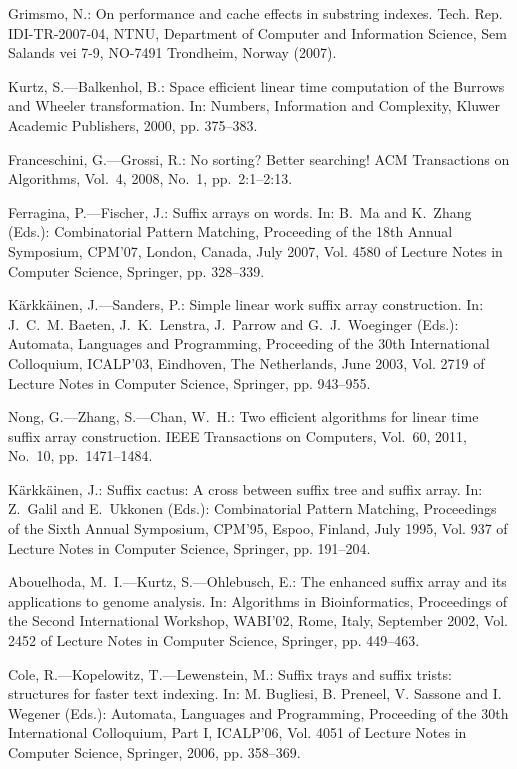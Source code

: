 \documentclass{cai}
\begin{document}
\begin{thebibliography}{99}
Grimsmo, N.: On performance and cache effects in substring indexes. Tech. Rep.
  IDI-TR-2007-04, NTNU, Department of Computer and Information Science, Sem
  Salands vei 7-9, NO-7491 Trondheim, Norway (2007).

Kurtz, S.---Balkenhol, B.: Space efficient linear time computation of the
  {Burrows} and {Wheeler} transformation. In: Numbers, Information and
  Complexity, Kluwer Academic Publishers, 2000, pp. 375--383.

Franceschini, G.---Grossi, R.: No sorting? {B}etter searching! ACM Transactions
  on Algorithms, Vol.~4, 2008, No.~1, pp.~2:1--2:13.

Ferragina, P.---Fischer, J.: Suffix arrays on words. 
  In: B.~Ma and K.~Zhang (Eds.):
  Combinatorial Pattern Matching,
  Proceeding of the 18th Annual Symposium, CPM'07, London, Canada, July 2007,
  Vol. 4580 of Lecture Notes in Computer Science, Springer, pp. 328--339.

K{\"a}rkk{\"a}inen, J.---Sanders, P.: Simple linear work suffix array
  construction. 
  In: J.~C.~M. Baeten, J.~K.~Lenstra, J.~Parrow and G.~J.~Woeginger (Eds.): 
  Automata, Languages and Programming,
  Proceeding of the 30th International Colloquium, ICALP'03,
  Eindhoven, The Netherlands, June 2003,
  Vol. 2719 of Lecture Notes in Computer Science, Springer, pp. 943--955.

Nong, G.---Zhang, S.---Chan, W.~H.: Two efficient algorithms for linear time suffix
  array construction. IEEE Transactions on Computers, Vol.~60, 2011, No.~10, 
  pp.~1471--1484.

K{\"a}rkk{\"a}inen, J.: Suffix cactus: A cross between suffix tree and suffix
  array. In: Z.~Galil and E.~Ukkonen (Eds.): 
  Combinatorial Pattern Matching,
  Proceedings of the Sixth Annual Symposium, CPM'95, Espoo, Finland, July 1995,
  Vol. 937 of Lecture Notes in Computer Science, Springer, pp. 191--204.

Abouelhoda, M.~I.---Kurtz, S.---Ohlebusch, E.: The enhanced suffix array and its
  applications to genome analysis.
  In: Algorithms in Bioinformatics, 
  Proceedings of the Second International Workshop, WABI'02, Rome, Italy, September 2002,
  Vol. 2452 of Lecture Notes in Computer Science, Springer, pp. 449--463.

Cole, R.---Kopelowitz, T.---Lewenstein, M.: Suffix trays and suffix trists:
  structures for faster text indexing. 
  In: M. Bugliesi, B. Preneel, V. Sassone and I. Wegener (Eds.):
  Automata, Languages and Programming,
  Proceeding of the 30th International Colloquium, Part I, ICALP'06,
  Vol. 4051 of Lecture Notes in Computer Science,
  Springer, 2006, pp. 358--369.


\end{thebibliography}
\end{document}
